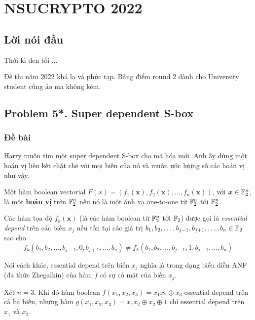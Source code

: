 \chapter*{NSUCRYPTO 2022}

\section*{Lời nói đầu}

Thời kì đen tối ...

Đề thi năm 2022 khá lạ và phức tạp. Bảng điểm round 2 dành cho University student cũng ảo ma không kém.

\section*{Problem 5*. Super dependent S-box}

\subsection*{Đề bài}

Harry muốn tìm một super dependent S-box cho mã hóa mới. Anh ấy dùng một hoán vị liên kết chặt chẽ với mọi biến của nó và muốn ước lượng số các hoán vị như vậy.

Một hàm boolean vectorial $F(x) = (f_1(\bm{x}), f_2(\bm{x}), \ldots, f_n(\bm{x}))$, với $\bm{x} \in \mathbb{F}_2^n$, là một \textbf{hoán vị} trên $\mathbb{F}_2^n$ nếu nó là một ánh xạ one-to-one từ $\mathbb{F}_2^n$ tới $\mathbb{F}_2^n$.

Các hàm tọa độ $f_k(\bm{x})$ (là các hàm boolean từ $\mathbb{F}_2^n$ tới $\mathbb{F}_2$) được gọi là \textit{essential depend} trên các biến $x_j$ nếu tồn tại các giá trị $b_1, b_2, \ldots, b_{j-1}, b_{j+1}, \ldots, b_n \in \mathbb{F}_2$ sao cho
\begin{equation*}
    f_k(b_1, b_2, \ldots, b_{j-1}, 0, b_{j+1},  \ldots, b_n) \neq f_k(b_1, b_2, \ldots, b_{j-1}, 1, b_{j+1}, \ldots, b_n)
\end{equation*}

Nói cách khác, essential depend trên biến $x_j$ nghĩa là trong dạng biểu diễn ANF (đa thức Zhegalkin) của hàm $f$ có sự có mặt của biến $x_j$.

\begin{example}
    Xét $n=3$. Khi đó hàm boolean $f(x_1, x_2, x_3) = x_1 x_2 \oplus x_3$ essential depend trên cả ba biến, nhưng hàm $g(x_1, x_2, x_3) = x_1 x_2 \oplus x_2 \oplus 1$ chỉ essential depend trên $x_1$ và $x_2$.
\end{example}

